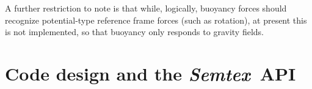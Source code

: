 \documentclass[11pt]{report}
\newcommand{\Semtex}{\emph{Semtex}} \newcommand{\Dog}{\emph{Dog}}
\newcommand\threed{three-di\-men\-sion\-al}
\begin{document}
A further restriction to note is that while, logically, buoyancy
forces should recognize potential-type reference frame forces (such as
rotation), at present this is not implemented, so that buoyancy only
responds to gravity fields.









\chapter{Code design and the \Semtex\ API}
\label{ch.api}
\end{document}
